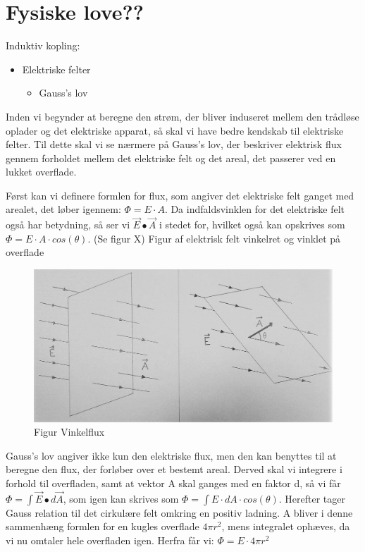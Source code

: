 \newpage

\section{Fysiske love??}
Induktiv kopling:
\begin{itemize}
\item Elektriske felter
\begin{itemize}
\item Gauss's lov
\end{itemize}
\end{itemize}

Inden vi begynder at beregne den strøm, der bliver induseret mellem den trådløse oplader og det elektriske apparat, så skal vi have bedre kendskab til elektriske felter. Til dette skal vi se nærmere på Gauss's lov, der beskriver elektrisk flux gennem forholdet mellem det elektriske felt og det areal, det passerer ved en lukket overflade.

Først kan vi definere formlen for flux, som angiver det elektriske felt ganget med arealet, det løber igennem: $\Phi = E \cdot A$. Da indfaldsvinklen for det elektriske felt også har betydning, så ser vi $\vec{E} \bullet \vec{A}$ i stedet for, hvilket også kan opskrives som $\Phi = E \cdot A \cdot cos(\theta)$. (Se figur X)
Figur af elektrisk felt vinkelret og vinklet på overflade

\begin{figure}[H]
\centering
\includegraphics[scale=0.5]{Vildledning/Schematics/vinkelflux.jpg}
\caption{Figur Vinkelflux}
\end{figure}

Gauss's lov angiver ikke kun den elektriske flux, men den kan benyttes til at beregne den flux, der forløber over et bestemt areal. Derved skal vi integrere i forhold til overfladen, samt at vektor A skal ganges med en faktor d, så vi får $\Phi = \int \vec{E} \bullet d \vec{A}$, som igen kan skrives som $\Phi = \int E \cdot dA \cdot cos(\theta)$. Herefter tager Gauss relation til det cirkulære felt omkring en positiv ladning. A bliver i denne sammenhæng formlen for en kugles overflade $4 \pi r^2$, mens integralet ophæves, da vi nu omtaler hele overfladen igen. Herfra får vi: $\Phi = E \cdot 4 \pi r^2$


